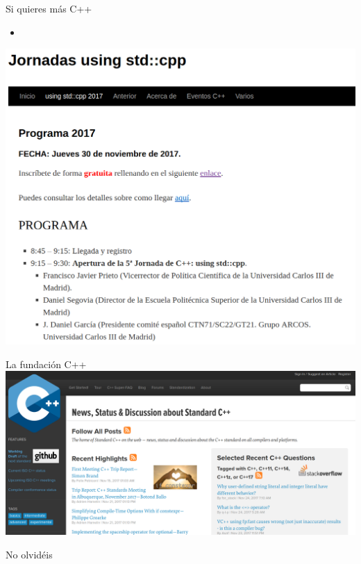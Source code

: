 \begin{frame}[t]{Si quieres más C++}
\begin{itemize}
  \item {}
\end{itemize}
\includegraphics[width=\textwidth]{img/using.png}
\end{frame}

\begin{frame}[t]{La fundación C++}
\includegraphics[width=\textwidth]{img/isocpp.png}
\end{frame}

\begin{frame}[t]{No olvidéis}
\vfill
\begin{Huge}
\begin{center}
\end{center}
\end{Huge}
\vfill
\end{frame}
